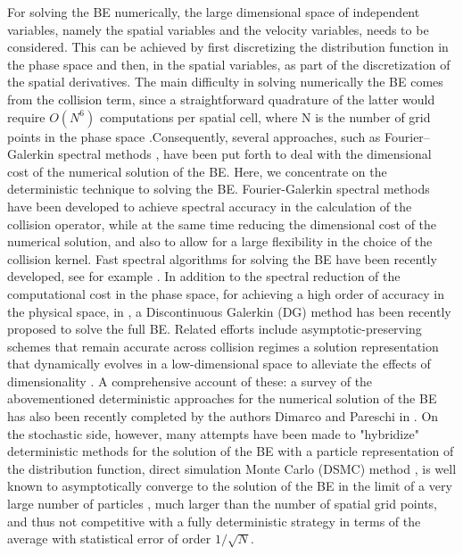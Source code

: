 \documentclass[11pt]{article}
\theoremstyle{plain}
\begin{document}
For solving the BE numerically, the large dimensional space of independent variables, namely the spatial variables and the velocity variables, needs to be considered. This can be achieved by first discretizing the distribution function in the phase space and then, in the spatial variables, as part of the discretization of the spatial derivatives. The main difficulty in solving numerically the BE comes from the collision term, since a straightforward quadrature of the latter would require $O(N^6)$ computations per spatial cell, where N is the number of grid points in the phase space \cite{jaiswal2019discontinuous}.Consequently, several approaches, such as Fourier–Galerkin spectral methods \cite{pareschi2000numerical}, have been put forth to deal with the dimensional cost of the numerical solution of the BE. Here, we concentrate on the deterministic technique to solving the BE. Fourier-Galerkin spectral methods have been developed to achieve spectral accuracy  in the calculation of the collision operator, while at the same time reducing the dimensional cost of the numerical solution, and also to allow for a large flexibility in the choice of the collision kernel. Fast spectral algorithms for solving the BE have been recently developed, see for example \cite{mouhot2006fast,gamba2017fast}. In addition to the spectral reduction of the computational cost in the phase space, for achieving a high order of accuracy in the physical space, in \cite{jaiswal2019discontinuous}, a Discontinuous Galerkin (DG) method has been recently proposed to solve the full BE. Related efforts include asymptotic-preserving schemes that remain accurate across collision regimes \cite{jin1999efficient} a solution representation that dynamically evolves in a low-dimensional space to alleviate the effects of dimensionality
\cite{einkemmer2018low,hu2022adaptive,wang2021efficient}. A comprehensive account of these: a survey of the abovementioned deterministic approaches for the numerical solution of the BE has also been recently completed by the authors Dimarco and Pareschi in \cite{dimarco2014numerical}. On the stochastic side, however, many attempts have been made to "hybridize" deterministic methods for the solution of the BE with a particle representation of the distribution function, direct simulation Monte Carlo (DSMC) method \cite{bird1994molecular,nanbu1980direct}, is well known to asymptotically converge to the solution of the BE in the limit of a very large number of particles \cite{wagner1992convergence}, much larger than the number of spatial grid points, and thus not competitive with a fully deterministic strategy in terms of the average with statistical error of order $1/\sqrt{N}$.
\end{document}
